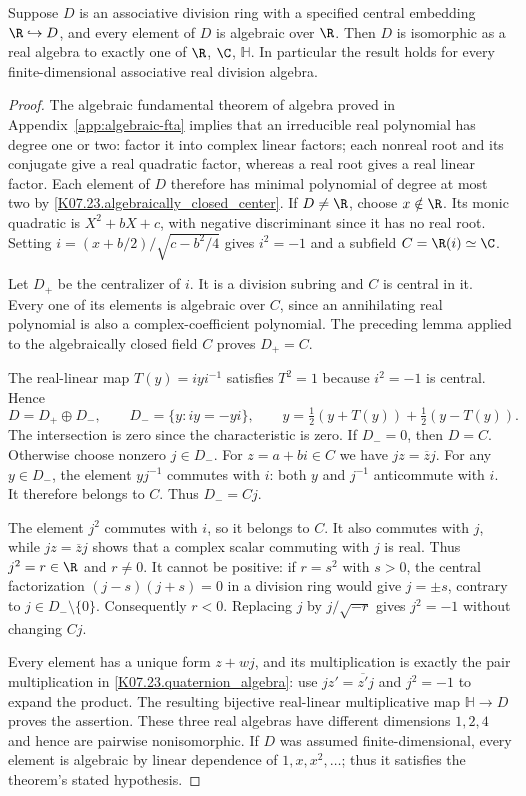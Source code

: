 \begin{theorem}
Suppose $D$ is an associative division ring with a specified central
embedding $\R\hookrightarrow D$, and every element of $D$ is algebraic
over $\R$. Then $D$ is isomorphic as a real algebra to exactly one of
$\R$, $\C$, $\mathbb H$. In particular the result holds for every
finite-dimensional associative real division algebra.
\end{theorem}
\begin{proof}
The algebraic fundamental theorem of algebra proved in
Appendix~\ref{app:algebraic-fta} implies that an irreducible real
polynomial has degree one or two: factor it into complex linear factors;
each nonreal root and its conjugate give a real quadratic factor, whereas
a real root gives a real linear factor. Each element of $D$ therefore
has minimal polynomial of degree at most two by
\ref{K07.23.algebraically_closed_center}. If $D\ne\R$, choose
$x\notin\R$. Its monic quadratic is $X^2+bX+c$, with negative
discriminant since it has no real root. Setting
$i=(x+b/2)/\sqrt{c-b^2/4}$ gives $i^2=-1$ and a subfield
$C=\R(i)\simeq\C$.

Let $D_+$ be the centralizer of $i$. It is a division subring and $C$
is central in it. Every one of its elements is algebraic over $C$, since
an annihilating real polynomial is also a complex-coefficient polynomial.
The preceding lemma applied to the algebraically closed field $C$ proves
$D_+=C$.

The real-linear map $T(y)=iyi^{-1}$ satisfies $T^2=1$ because
$i^2=-1$ is central. Hence
\[
 D=D_+\oplus D_-,\qquad
 D_-=\{y:iy=-yi\},\qquad
 y=\tfrac12(y+T(y))+\tfrac12(y-T(y)).
\]
The intersection is zero since the characteristic is zero. If $D_-=0$,
then $D=C$. Otherwise choose nonzero $j\in D_-$. For $z=a+bi\in C$
we have $jz=\overline z j$. For any $y\in D_-$, the element
$yj^{-1}$ commutes with $i$: both $y$ and $j^{-1}$ anticommute with
$i$. It therefore belongs to $C$. Thus $D_-=Cj$.

The element $j^2$ commutes with $i$, so it belongs to $C$. It also
commutes with $j$, while $jz=\overline z j$ shows that a complex
scalar commuting with $j$ is real. Thus $j^2=r\in\R$ and $r\ne0$.
It cannot be positive: if $r=s^2$ with $s>0$, the central factorization
$(j-s)(j+s)=0$ in a division ring would give $j=\pm s$, contrary
to $j\in D_-\setminus\{0\}$. Consequently $r<0$. Replacing $j$
by $j/\sqrt{-r}$ gives $j^2=-1$ without changing $Cj$.

Every element has a unique form $z+w j$, and its multiplication is
exactly the pair multiplication in \ref{K07.23.quaternion_algebra}:
use $jz'=\overline{z'}j$ and $j^2=-1$ to expand the product.
The resulting bijective real-linear multiplicative map
$\mathbb H\to D$ proves the assertion. These three real algebras have
different dimensions $1,2,4$ and hence are pairwise nonisomorphic.
If $D$ was assumed finite-dimensional, every element is algebraic by
linear dependence of $1,x,x^2,\ldots$; thus it satisfies the theorem's
stated hypothesis.
\end{proof}
